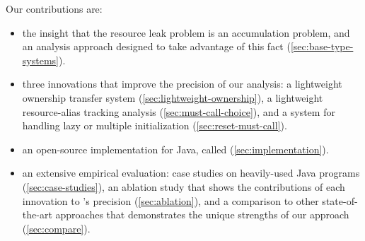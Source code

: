 Our contributions are:
\begin{itemize}
\item the insight that the resource leak problem is an accumulation
  problem, and
  an analysis approach designed to take advantage
  of this fact (\cref{sec:base-type-systems}).
\item three
  innovations that improve the precision of our analysis:
  a lightweight ownership transfer system
  (\cref{sec:lightweight-ownership}), a lightweight resource-alias
  tracking analysis (\cref{sec:must-call-choice}), and a system for
  handling lazy or multiple initialization (\cref{sec:reset-must-call}).
\item an open-source implementation for Java,
  called \tool (\cref{sec:implementation}).
\item an extensive empirical evaluation: case studies on heavily-used
  Java programs (\cref{sec:case-studies}),
  an ablation study that shows the contributions of each innovation to
  \tool's precision (\cref{sec:ablation}), and a comparison to
  other state-of-the-art approaches that demonstrates the unique strengths
  of our approach (\cref{sec:compare}).
\end{itemize}
  

